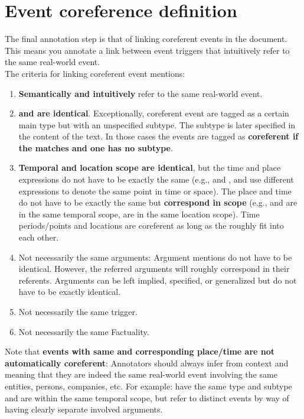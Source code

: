 \section{Event coreference definition} \label{sec:eventcorefdefinition}

The final annotation step is that of linking coreferent events in the document.
This means you annotate a link between event triggers that intuitively refer to the same real-world event.\\[10pt]
\noindent
The criteria for linking coreferent event mentions:
\begin{enumerate}[noitemsep]
    \item \textbf{Semantically and intuitively} refer to the same real-world event.
    \item \textbf{ and  are identical}. Exceptionally, coreferent event are tagged as a certain main type but with an unspecified subtype. The subtype is later specified in the content of the text. In those cases the events are tagged as \textbf{coreferent if the  matches and one has no subtype}.
    \item \textbf{Temporal and location scope are identical}, but the time and place expressions do not have to be exactly the same (e.g.,  and ,  and  use different expressions to denote the same point in time or space).
    The place and time do not have to be exactly the same but \textbf{correspond in scope} (e.g.,  and  are in the same temporal scope,  are in the same location scope).
    Time periods/points and locations are coreferent as long as the roughly fit into each other.
    \item Not necessarily the same arguments:
    Argument mentions do not have to be identical.
    However, the referred arguments will roughly correspond in their referents.
    Arguments can be left implied, specified, or generalized but do not have to be exactly identical.
    \item Not necessarily the same trigger.
    \item Not necessarily the same Factuality.
\end{enumerate}

\noindent
Note that \textbf{events with same  and corresponding place/time are not automatically coreferent}:
Annotators should always infer from context and meaning that they are indeed the same real-world event involving the same entities, persons, companies, etc.
For example:  have the same  type and subtype and are within the same temporal scope, but refer to distinct events by way of having clearly separate involved arguments.\\

